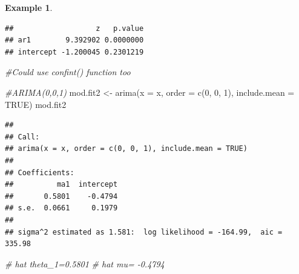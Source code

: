 \documentclass[
]{book}
\newenvironment{Shaded}{\begin{snugshade}}{\end{snugshade}}
\newcommand{\AttributeTok}[1]{\textcolor[rgb]{0.77,0.63,0.00}{#1}}
\newcommand{\CommentTok}[1]{\textcolor[rgb]{0.56,0.35,0.01}{\textit{#1}}}
\newcommand{\ConstantTok}[1]{\textcolor[rgb]{0.00,0.00,0.00}{#1}}
\newcommand{\DecValTok}[1]{\textcolor[rgb]{0.00,0.00,0.81}{#1}}
\newcommand{\FunctionTok}[1]{\textcolor[rgb]{0.00,0.00,0.00}{#1}}
\newcommand{\NormalTok}[1]{#1}
\newcommand{\OtherTok}[1]{\textcolor[rgb]{0.56,0.35,0.01}{#1}}
\newcommand{\SpecialCharTok}[1]{\textcolor[rgb]{0.00,0.00,0.00}{#1}}
\theoremstyle{definition}
\theoremstyle{definition}
\newtheorem{example}{Example}[chapter]
\theoremstyle{definition}
\theoremstyle{definition}
\theoremstyle{remark}
\begin{document}
\begin{example}
\begin{verbatim}
##                   z   p.value
## ar1        9.392902 0.0000000
## intercept -1.200045 0.2301219
\end{verbatim}

\begin{Shaded}
\begin{Highlighting}[]
\CommentTok{\#Could use confint() function too }
\end{Highlighting}
\end{Shaded}

\begin{Shaded}
\begin{Highlighting}[]
\CommentTok{\#ARIMA(0,0,1)}
\NormalTok{mod.fit2 }\OtherTok{\textless{}{-}} \FunctionTok{arima}\NormalTok{(}\AttributeTok{x =}\NormalTok{ x, }\AttributeTok{order =} \FunctionTok{c}\NormalTok{(}\DecValTok{0}\NormalTok{, }\DecValTok{0}\NormalTok{, }\DecValTok{1}\NormalTok{), include.mean }
    \OtherTok{=} \ConstantTok{TRUE}\NormalTok{)}
\NormalTok{mod.fit2}
\end{Highlighting}
\end{Shaded}

\begin{verbatim}
## 
## Call:
## arima(x = x, order = c(0, 0, 1), include.mean = TRUE)
## 
## Coefficients:
##          ma1  intercept
##       0.5801    -0.4794
## s.e.  0.0661     0.1979
## 
## sigma^2 estimated as 1.581:  log likelihood = -164.99,  aic = 335.98
\end{verbatim}

\begin{Shaded}
\begin{Highlighting}[]
\CommentTok{\# hat theta\_1=0.5801}
\CommentTok{\# hat mu= {-}0.4794}
\end{Highlighting}
\end{Shaded}

\begin{Shaded}
\end{Shaded}


\end{example}
\end{document}
